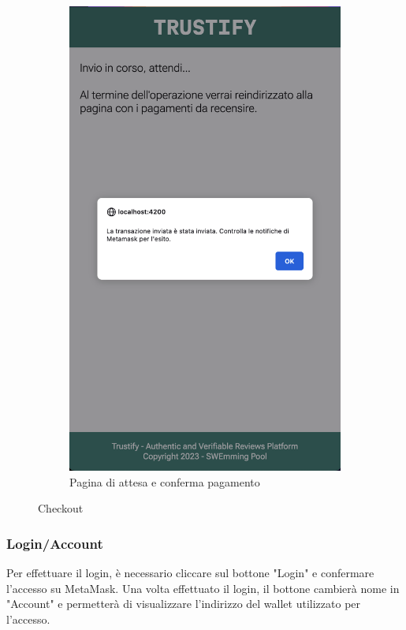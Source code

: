 \begin{figure}[t]
\begin{subfigure}{0.33\textwidth}
    \includegraphics[width=0.9\linewidth]{src/img/checkout_conferma.png}
    \caption{Pagina di attesa e conferma pagamento}\label{fig:checkout_conferma}
    \end{subfigure}

    \caption{Checkout}\label{fig:checkout}
\end{figure}

\subsubsection{Login/Account}
Per effettuare il login, è necessario cliccare sul bottone "Login" e confermare l'accesso su MetaMask. Una volta effettuato il login, il bottone cambierà nome in "Account" e permetterà di visualizzare l'indirizzo del wallet utilizzato per l'accesso.

